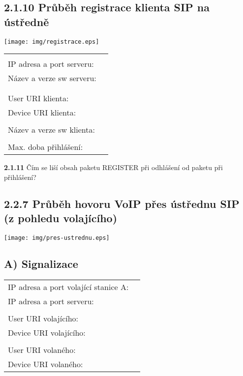 \documentclass[a4paper,11pt]{article}
\begin{document}
\subsection*{2.1.10 Průběh registrace klienta SIP na ústředně}
\begin{multicols}{2}
  \begin{center}
    \texttt{[image: img/registrace.eps]}
  \end{center}
  \columnbreak
  
  \begin{tabular}{lp{2cm}}
    &\\
    IP adresa a port serveru: &\\
    Název a verze sw serveru: &\\
    &\\
    &\\
    User URI klienta: &\\
    Device URI klienta: &\\
    &\\
    Název a verze sw klienta: &\\
    &\\
    Max. doba přihlášení: &\\
  \end{tabular}               
\end{multicols}
   {\bf 2.1.11} Čím se liší obsah paketu REGISTER při odhlášení od paketu při přihlášení?

\subsection*{2.2.7 Průběh hovoru VoIP přes ústřednu SIP (z pohledu volajícího)}
  \begin{center}    
    \texttt{[image: img/pres-ustrednu.eps]}
  \end{center}
  \vspace{1cm}

  \subsection*{A) Signalizace}
  \begin{tabular}{lp{2cm}}
    IP adresa a port volající stanice A: &\\
    IP adresa a port serveru: &\\
    &\\
    User URI volajícího: &\\
    Device URI volajícího: &\\
    &\\
    User URI volaného: &\\
    Device URI volaného: &\\
  \end{tabular}               
\end{document}
